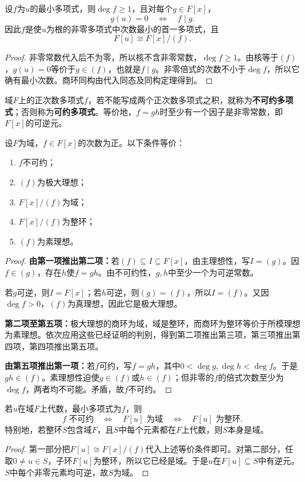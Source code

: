 \begin{proposition}
设$f$为$u$的最小多项式，则$\deg f\ge1$，且对每个$g\in F[x]$，
\[
g(u)=0\quad\Longleftrightarrow\quad f\mid g.
\]
因此$f$是使$u$为根的非零多项式中次数最小的首一多项式，且
\[
F[u]\cong F[x]/(f).
\]
\end{proposition}
\begin{proof}
非零常数代入后不为零，所以核不含非零常数，$\deg f\ge1$。由核等于$(f)$，$g(u)=0$等价于$g\in(f)$，也就是$f\mid g$。非零倍式的次数不小于$\deg f$，所以它确有最小次数。商环同构由代入同态及同构定理得到。
\end{proof}

\begin{definition}
域$F$上的正次数多项式$f$，若不能写成两个正次数多项式之积，就称为\textbf{不可约多项式}；否则称为\textbf{可约多项式}。等价地，$f=gh$时至少有一个因子是非零常数，即$F[x]$的可逆元。
\end{definition}

\begin{theorem}\label{p2:irreducible-maximal}
设$F$为域，$f\in F[x]$的次数为正。以下条件等价：
\begin{enumerate}
\item $f$不可约；
\item $(f)$为极大理想；
\item $F[x]/(f)$为域；
\item $F[x]/(f)$为整环；
\item $(f)$为素理想。
\end{enumerate}
\end{theorem}
\begin{proof}
\textbf{由第一项推出第二项：}若$(f)\subseteq I\subseteq F[x]$，由主理想性，写$I=(g)$。因$f\in(g)$，存在$h$使$f=gh$。由不可约性，$g,h$中至少一个为可逆常数。

若$g$可逆，则$I=F[x]$；若$h$可逆，则$(g)=(f)$，所以$I=(f)$。又因$\deg f>0$，$(f)$为真理想，因此它是极大理想。

\textbf{第二项至第五项：}极大理想的商环为域，域是整环，而商环为整环等价于所模理想为素理想。依次应用这些已经证明的判别，得到第二项推出第三项，第三项推出第四项，第四项推出第五项。

\textbf{由第五项推出第一项：}若$f$可约，写$f=gh$，其中$0<\deg g,\deg h<\deg f$。于是$gh\in(f)$。素理想性迫使$g\in(f)$或$h\in(f)$；但非零的$f$的倍式次数至少为$\deg f$，两者均不可能。矛盾，故$f$不可约。
\end{proof}

\begin{corollary}
若$u$在域$F$上代数，最小多项式为$f$，则
\[
f\text{ 不可约}\quad\Longleftrightarrow\quad F[u]\text{ 为域}
\quad\Longleftrightarrow\quad F[u]\text{ 为整环}.
\]
特别地，若整环$S$包含域$F$，且$S$中每个元素都在$F$上代数，则$S$本身是域。
\end{corollary}
\begin{proof}
第一部分把$F[u]\cong F[x]/(f)$代入上述等价条件即可。对第二部分，任取$0\ne u\in S$，子环$F[u]$为整环，所以它已经是域。于是$u$在$F[u]\subseteq S$中有逆元。$S$中每个非零元素均可逆，故$S$为域。
\end{proof}

